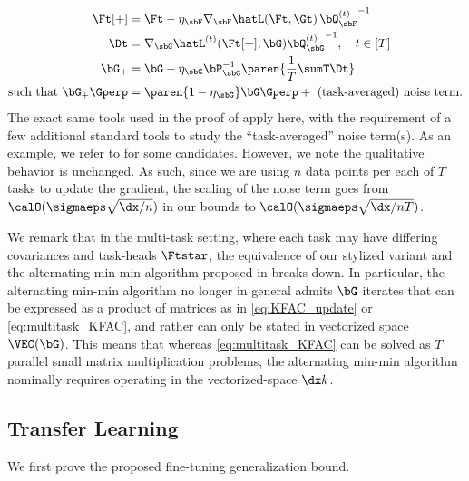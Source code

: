 \begin{align}\label{eq:multitask_KFAC}
    \Ft[+] &= \Ft - \eta_\sbF \nabla_\sbF \hatL(\Ft, \Gt)\, {\bQ^{(t)}_{\sbF}}^{-1} \\
    \Dt &= \nabla_{\sbG} \hatL^{(t)}(\Ft[+], \bG){\bQ^{(t)}_\sbG}^{-1}, \quad t \in [T] \\
    \bG_+ &= \bG - \eta_\sbG \bP_\sbG^{-1} \paren{\frac{1}{T}\sumT \Dt} \\
    \text{such that }\bG_+ \Gperp &= \paren{1 - \eta_\sbG} \bG\Gperp + \text{ (task-averaged) noise term}.
\end{align}
The exact same tools used in the proof of  apply here, with the requirement of a few additional standard tools to study the ``task-averaged'' noise term(s). As an example, we refer to \citet{zhang2023meta} for some candidates. However, we note the qualitative behavior is unchanged. As such, since we are using $n$ data points per each of $T$ tasks to update the gradient, the scaling of the noise term goes from $\calO(\sigmaeps \sqrt{\dx/n})$ in our bounds to $\calO(\sigmaeps \sqrt{\dx/nT})$. 

We remark that in the multi-task setting, where each task may have differing covariances and task-heads $\Ftstar$, the equivalence of our stylized \KFAC variant and the alternating min-min algorithm proposed in \citet{jain2013low, thekumparampil2021sample} breaks down. In particular, the alternating min-min algorithm no longer in general admits $\bG$ iterates that can be expressed as a product of matrices as in \eqref{eq:KFAC_update} or \eqref{eq:multitask_KFAC}, and rather can only be stated in vectorized space $\VEC(\bG)$. This means that whereas \eqref{eq:multitask_KFAC} can be solved as $T$ parallel small matrix multiplication problems, the alternating min-min algorithm nominally requires operating in the vectorized-space $\dx k$.


\subsection*{Transfer Learning}

We first prove the proposed fine-tuning generalization bound.

\LinRepTransfer*

